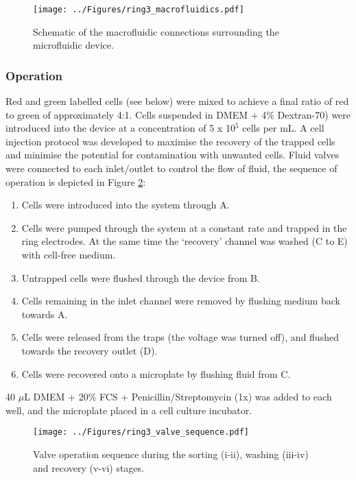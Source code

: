 \begin{figure}
	\centering
		\texttt{[image: ../Figures/ring3\_macrofluidics.pdf]}
	\caption{Schematic of the macrofluidic connections surrounding the microfluidic device.}
	\label{fig:ring3_macrofluidics}
\end{figure}

\subsubsection{Operation}
Red and green labelled cells (see below) were mixed to achieve a final ratio of red to green of approximately 4:1. Cells suspended in DMEM + 4\% Dextran-70) were introduced into the device at a concentration of 5 x 10$^{5}$ cells per mL. A cell injection protocol was developed to maximise the recovery of the trapped cells and minimise the potential for contamination with unwanted cells. Fluid valves were connected to each inlet/outlet to control the flow of fluid, the sequence of operation is depicted in Figure \ref{fig:ring3_valve_sequence}:

\renewcommand{\labelenumi}{\roman{enumi}.}
\begin{enumerate}
	\item Cells were introduced into the system through A.
	\item Cells were pumped through the system at a constant rate and trapped in the ring electrodes. At the same time the `recovery' channel was washed (C to E) with cell-free medium.
	\item Untrapped cells were flushed through the device from B.
	\item Cells remaining in the inlet channel were removed by flushing medium back towards A.
	\item Cells were released from the traps (the voltage was turned off), and flushed towards the recovery outlet (D).
	\item Cells were recovered onto a microplate by flushing fluid from C.
\end{enumerate}

40 $\mu$L DMEM + 20\% FCS + Penicillin/Streptomycin (1x) was added to each well, and the microplate placed in a cell culture incubator. 


\begin{figure}
	\centering
		\texttt{[image: ../Figures/ring3\_valve\_sequence.pdf]}
	\caption[Valve operation sequence.]{Valve operation sequence during the sorting (i-ii), washing (iii-iv) and recovery (v-vi) stages.}
	\label{fig:ring3_valve_sequence}
\end{figure}


